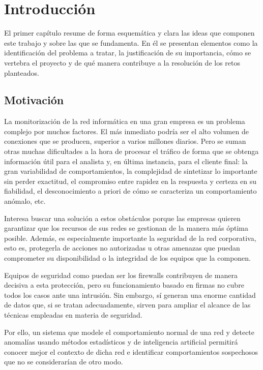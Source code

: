 \chapter{Introducción}\label{chap:introduccion}

El primer capítulo resume de forma esquemática y clara las ideas que componen este trabajo y sobre las que se fundamenta.
En él se presentan elementos como la identificación del problema a tratar, la justificación de su importancia, cómo se vertebra el proyecto y de qué manera contribuye a la resolución de los retos planteados.

\section{Motivación}\label{sec:motivacion}

La monitorización de la red informática en una gran empresa es un problema complejo por muchos factores.
El más inmediato podría ser el alto volumen de conexiones que se producen, superior a varios millones diarios.
Pero se suman otras muchas dificultades a la hora de procesar el tráfico de forma que se obtenga información útil para el analista y, en última instancia, para el cliente final:
la gran variabilidad de comportamientos, la complejidad de sintetizar lo importante sin perder exactitud,
el compromiso entre rapidez en la respuesta y certeza en su fiabilidad, el desconocimiento a priori de cómo se caracteriza un comportamiento anómalo, etc.

Interesa buscar una solución a estos obstáculos porque las empresas quieren garantizar que los recursos de sus redes se gestionan de la manera más óptima posible.
Además, es especialmente importante la seguridad de la red corporativa, esto es, protegerla de acciones no autorizadas u otras amenazas que puedan comprometer su disponibilidad o la integridad de los equipos que la componen.

Equipos de seguridad como puedan ser los firewalls contribuyen de manera decisiva a esta protección, pero su funcionamiento basado en firmas no cubre todos los casos ante una intrusión.
Sin embargo, sí generan una enorme cantidad de datos que, si se tratan adecuadamente, sirven para ampliar el alcance de las técnicas empleadas en materia de seguridad.

Por ello, un sistema que modele el comportamiento normal de una red y detecte anomalías usando métodos estadísticos y de inteligencia artificial permitirá
conocer mejor el contexto de dicha red e identificar comportamientos sospechosos que no se considerarían de otro modo.

